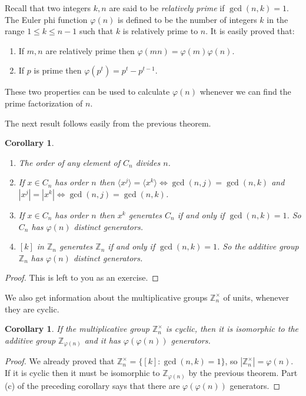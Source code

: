 \documentclass[11pt]{article}
\newtheorem{cor}[thm]{Corollary}
\theoremstyle{definition}
\newcommand{\Z}{\mathbb{Z}} %
\newcommand{\gen}[1]{\langle #1 \rangle}
\begin{document}
Recall that two integers $k,n$ are said to be \emph{relatively prime}
if $\gcd(n,k) = 1$.  The Euler phi
function $\varphi(n)$ is defined to be the
number of integers $k$ in the range $1 \le k \le n-1$ such that $k$ is
relatively prime to $n$. It is easily proved that:
\begin{enumerate}[label=(\roman*)]
\item If $m,n$ are relatively prime then $\varphi(mn) =
  \varphi(m)\varphi(n)$.
\item If $p$ is prime then $\varphi(p^t) = p^t - p^{t-1}$.
\end{enumerate}
These two properties can be used to calculate $\varphi(n)$ whenever we
can find the prime factorization of $n$.

The next result follows easily from the previous theorem.

\begin{cor}\label{cor:orders}
  \begin{enumerate}
  \item The order of any element of $C_n$ divides $n$. 
  \item If $x \in C_n$ has order $n$ then
    $\gen{x^j} = \gen{x^k} \iff \gcd(n,j) = \gcd(n,k)$ and
    $|x^j| = |x^k| \iff \gcd(n,j) = \gcd(n,k)$.
  \item If $x \in C_n$ has order $n$ then $x^k$ generates $C_n$ if and
    only if $\gcd(n,k) = 1$. So $C_n$ has $\varphi(n)$ distinct
    generators.
  \item $[k]$ in $\Z_n$ generates $\Z_n$ if and only if $\gcd(n,k) =
    1$.  So the additive group $\Z_n$ has $\varphi(n)$ distinct
    generators.
  \end{enumerate}
\end{cor}

\begin{proof}
  This is left to you as an exercise.
\end{proof}

We also get information about the multiplicative groups $\Z_n^\times$
of units, whenever they are cyclic. 

\begin{cor}
  If the multiplicative group $\Z_n^\times$ is cyclic, then it is
  isomorphic to the additive group $\Z_{\varphi(n)}$ and it has
  $\varphi(\varphi(n))$ generators.
\end{cor}

\begin{proof}
We already proved that $\Z_n^\times = \{ [k] : \gcd(n,k) = 1 \}$, so
$|\Z_n^\times| = \varphi(n)$. If it is cyclic then it must be
isomorphic to $\Z_{\varphi(n)}$ by the previous theorem. Part (c) of
the preceding corollary says that there are $\varphi(\varphi(n))$
generators.
\end{proof}
\end{document}
